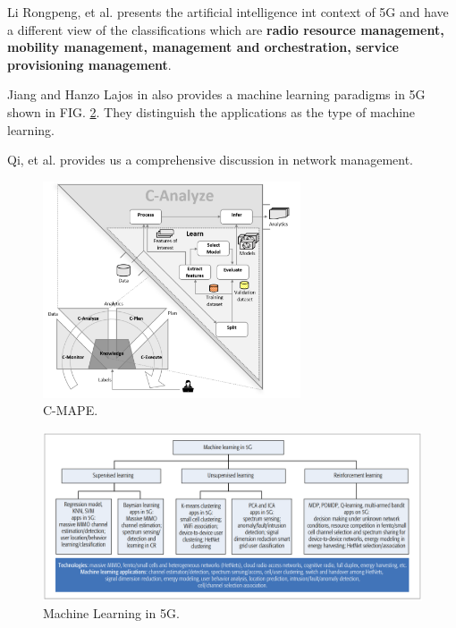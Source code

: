 \documentclass[journal,UTF8]{IEEEtran}
\begin{document}
Li Rongpeng, et al. \cite{Li2017Intelligent} presents the artificial intelligence int context of 5G and have a different view of the classifications which are \textbf{radio resource management, mobility management, management and orchestration, service provisioning management}.

Jiang and Hanzo Lajos in \cite{Jiang2017Machine} also provides a machine learning paradigms in 5G shown in FIG. \ref{fig:MLin5G}. They distinguish the applications as the type of machine learning.

Qi, et al. \cite{Qi2007Artificial} provides us a comprehensive discussion in network management.



\begin{figure}
	\centering
	\includegraphics[width=3in]{fig/C-MAPE.png}
	\caption{C-MAPE.}
	\label{fig:CMAPE}
\end{figure}

\begin{figure}
	\centering
	\includegraphics[width=7in]{fig/MLin5G.png}
	\caption{Machine Learning in 5G.}
	\label{fig:MLin5G}
\end{figure}
\end{document}
